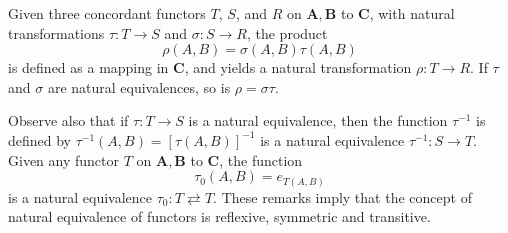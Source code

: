 \documentclass[11pt,a4paper]{report}
\begin{document}
Given three concordant functors $T$, $S$, and $R$ on $\mathbf{A,B}$ to $\mathbf{C}$, with natural
transformations $\tau:T\rightarrow S$ and $\sigma:S\rightarrow R$, the product
\begin{equation*}
	\rho(A,B)=\sigma(A,B)\tau(A,B)
\end{equation*}
is defined as a mapping in $\mathbf{C}$, and yields a natural transformation $\rho:T\rightarrow R$.
If $\tau$ and $\sigma$ are natural equivalences, so is $\rho = \sigma\tau$.

Observe also that if $\tau:T\rightarrow S$ is a natural equivalence, then the function $\tau^{-1}$
is defined by $\tau^{-1}(A,B)={[\tau(A,B)]}^{-1}$ is a natural equivalence $\tau^{-1}:S\rightarrow T$.
Given any functor $T$ on $\mathbf{A,B}$ to $\mathbf{C}$, the function
\begin{equation*}
	\tau_0(A,B) = e_{T(A,B)}
\end{equation*}
is a natural equivalence $\tau_0:T\rightleftarrows T$. These remarks imply that the concept of natural
equivalence of functors is reflexive, symmetric and transitive.
\end{document}
